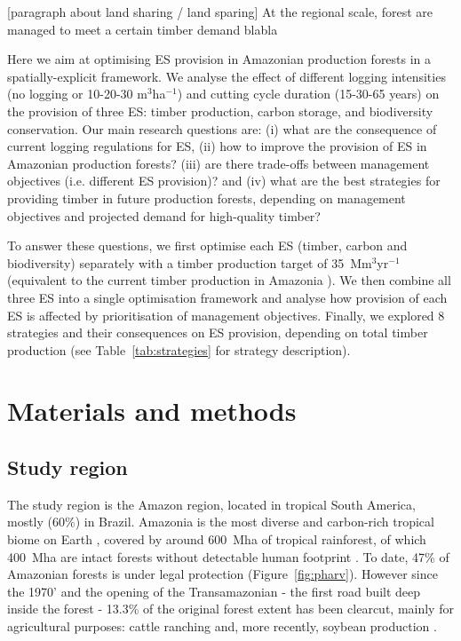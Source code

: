 \documentclass{article}
\begin{document}
[paragraph about land sharing / land sparing] At the regional scale, forest are managed to meet a certain timber demand blabla

Here we aim at optimising ES provision in Amazonian production forests in a spatially-explicit framework. We analyse the effect of different logging intensities (no logging or 10-20-30 m$^3$ha$^{-1}$) and cutting cycle duration (15-30-65 years) on the provision of three ES: timber production, carbon storage, and biodiversity conservation. Our main research questions are: (i) what are the consequence of current logging regulations for ES, (ii) how to improve the provision of ES in Amazonian production forests? (iii) are there trade-offs between management objectives (i.e. different ES provision)? and (iv) what are the best strategies for providing timber in future production forests, depending on management objectives and projected demand for high-quality timber? 

To answer these questions, we first optimise each ES (timber, carbon and biodiversity) separately with a timber production target of 35~Mm$^3$yr$^{-1}$ (equivalent to the current timber production in Amazonia \cite{Lentini2005}). We then combine all three ES into a single optimisation framework and analyse how provision of each ES is affected by prioritisation of management objectives. Finally, we explored 8 strategies and their consequences on ES provision, depending on total timber production (see Table~\ref{tab:strategies} for strategy description).

\section{Materials and methods}

\subsection{Study region}

The study region is the Amazon region, located in tropical South America, mostly (60\%) in Brazil. Amazonia is the most diverse and carbon-rich tropical biome on Earth \cite{Avitabile2016,Pimm2014}, covered by around 600~Mha of tropical rainforest, of which 400~Mha are intact forests without detectable human footprint \cite{Potapov2017}. To date, 47\% of Amazonian forests is under legal protection \cite{WDPA2016} (Figure~\ref{fig:pharv}). However since the 1970' and the opening of the Transamazonian - the first road built deep inside the forest - 13.3\% of the original forest extent has been clearcut, mainly for agricultural purposes: cattle ranching and, more recently, soybean production \cite{Fearnside2017}. 
\end{document}
